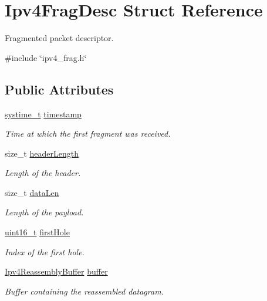 \hypertarget{structIpv4FragDesc}{}\section{Ipv4\+Frag\+Desc Struct Reference}
\label{structIpv4FragDesc}


Fragmented packet descriptor.  




{\ttfamily \#include \char`\"{}ipv4\+\_\+frag.\+h\char`\"{}}

\subsection*{Public Attributes}
\begin{DoxyCompactItemize}
\item 
\hyperlink{compiler__port_8h_ae3e32a98d431a02106616da3071832dd}{systime\+\_\+t} \hyperlink{structIpv4FragDesc_a1cbafc6835eb22a2945d4bef3090d82a}{timestamp}
\begin{DoxyCompactList}\small\item\em Time at which the first fragment was received. \end{DoxyCompactList}\item 
size\+\_\+t \hyperlink{structIpv4FragDesc_a252d5cce2a3261863d1f4a55e33d4fdc}{header\+Length}
\begin{DoxyCompactList}\small\item\em Length of the header. \end{DoxyCompactList}\item 
size\+\_\+t \hyperlink{structIpv4FragDesc_ae0496f42fdecf5ead0db14b0eca0419d}{data\+Len}
\begin{DoxyCompactList}\small\item\em Length of the payload. \end{DoxyCompactList}\item 
\hyperlink{stdint_8h_a273cf69d639a59973b6019625df33e30}{uint16\+\_\+t} \hyperlink{structIpv4FragDesc_aecd2b578651ed97157db0013466e4e33}{first\+Hole}
\begin{DoxyCompactList}\small\item\em Index of the first hole. \end{DoxyCompactList}\item 
\hyperlink{structIpv4ReassemblyBuffer}{Ipv4\+Reassembly\+Buffer} \hyperlink{structIpv4FragDesc_a348be10f5e00d0cf9bcb1b18c5c367cb}{buffer}
\begin{DoxyCompactList}\small\item\em Buffer containing the reassembled datagram. \end{DoxyCompactList}\end{DoxyCompactItemize}


